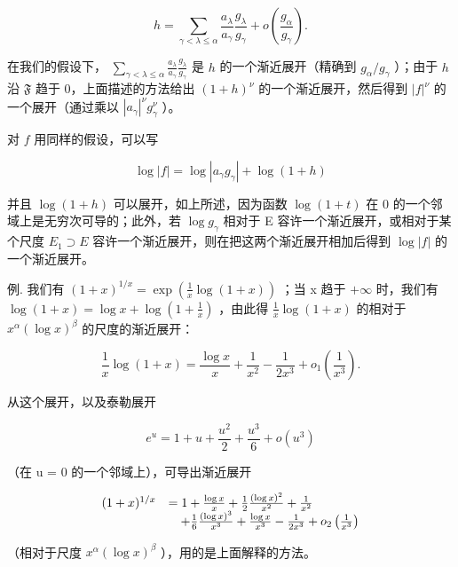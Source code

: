\[
h = \sum_ {\gamma <   \lambda \leqslant \alpha} \frac {a _ {\lambda}}{a _ {\gamma}} \frac {g _ {\lambda}}{g _ {\gamma}} + o \left(\frac {g _ {\alpha}}{g _ {\gamma}}\right).
\]

在我们的假设下， \(\sum_{\gamma < \lambda \leqslant \alpha} \frac{a_{\lambda}}{a_{\gamma}} \frac{g_{\lambda}}{g_{\gamma}}\) 是 \(h\) 的一个渐近展开（精确到 \(g_{\alpha} / g_{\gamma}\) ）；由于 \(h\) 沿 \(\mathfrak{F}\) 趋于 0，上面描述的方法给出 \((1 + h)^{\nu}\) 的一个渐近展开，然后得到 \(|f|^{\nu}\) 的一个展开（通过乘以 \(\left|a_{\gamma}\right|^{\nu} g_{\gamma}^{\nu}\) ）。

对 \(f\) 用同样的假设，可以写

\[
\log | f | = \log \left| a _ {\gamma} g _ {\gamma} \right| + \log (1 + h)
\]

并且 \(\log(1+h)\) 可以展开，如上所述，因为函数 \(\log(1+t)\) 在 0 的一个邻域上是无穷次可导的；此外，若 \(\log g_{\gamma}\) 相对于 E 容许一个渐近展开，或相对于某个尺度 \(E_{1} \supset E\) 容许一个渐近展开，则在把这两个渐近展开相加后得到 \(\log|f|\) 的一个渐近展开。

例. 我们有 \((1+x)^{1/x}=\exp\left(\frac{1}{x}\log(1+x)\right)\) ；当 x 趋于 \(+\infty\) 时，我们有 \(\log(1+x)=\log x+\log\left(1+\frac{1}{x}\right)\) ，由此得 \(\frac{1}{x}\log(1+x)\) 的相对于 \(x^{\alpha}(\log x)^{\beta}\) 的尺度的渐近展开：

\[
\frac {1}{x} \log (1 + x) = \frac {\log x}{x} + \frac {1}{x ^ {2}} - \frac {1}{2 x ^ {3}} + o _ {1} \left(\frac {1}{x ^ {3}}\right).
\]

从这个展开，以及泰勒展开

\[
e ^ {u} = 1 + u + \frac {u ^ {2}}{2} + \frac {u ^ {3}}{6} + o (u ^ {3})
\]

（在 u = 0 的一个邻域上），可导出渐近展开

\[
\begin{array}{r l} (1 + x) ^ {1 / x} & = 1 + \frac {\log x}{x} + \frac {1}{2} \frac {(\log x) ^ {2}}{x ^ {2}} + \frac {1}{x ^ {2}} \\ & \quad + \frac {1}{6} \frac {(\log x) ^ {3}}{x ^ {3}} + \frac {\log x}{x ^ {3}} - \frac {1}{2 x ^ {3}} + o _ {2} \left(\frac {1}{x ^ {3}}\right) \end{array}
\]

（相对于尺度 \(x^{\alpha}(\log x)^{\beta}\) ），用的是上面解释的方法。

